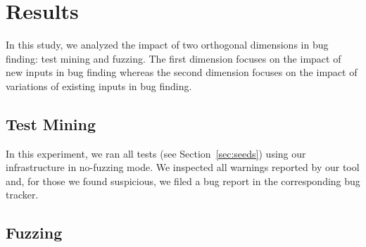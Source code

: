 \documentclass[10pt,conference,anonymous]{IEEEtran}
\begin{document}


\section{Results}
\label{sec:results}

In this study, we analyzed the impact of two orthogonal dimensions in
bug finding: test mining and fuzzing. The first dimension focuses on
the impact of new inputs in bug finding whereas the second dimension
focuses on the impact of variations of existing inputs in bug finding.

\subsection{Test Mining}

In this experiment, we ran all tests (see Section~\ref{sec:seeds})
using our infrastructure in no-fuzzing mode. We inspected all warnings
reported by our tool and, for those we found suspicious, we filed a
bug report in the corresponding bug tracker.





\subsection{Fuzzing}
\end{document}
